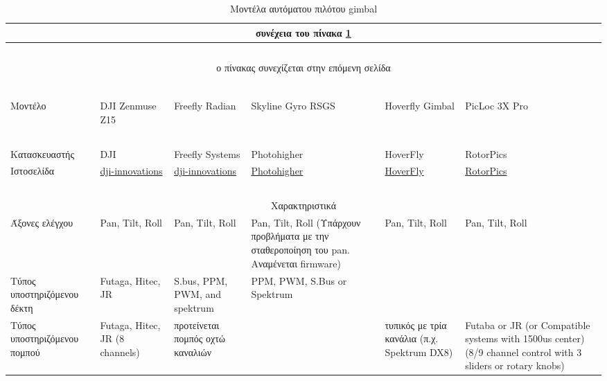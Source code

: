 \documentclass[a4paper, 12pt, twoside]{report}
\begin{document}
{{{{{{			\begin{landscape}	
			\setlength\LTleft{0pt}            %
			\setlength\LTright{0pt}           %
	
			\begin{longtable} { m{3cm} m{3cm} m{3cm} m{3cm} m{3cm} m{3cm} }
					\caption [Μοντέλα αυτόματου πιλότου gimbal]{Μοντέλα αυτόματου πιλότου gimbal}
					\label{πιν.:Μοντέλα αυτόματου πιλότου gimbal}\\
					\hline
					\endfirsthead
					\multicolumn{6}{c}{συνέχεια του πίνακα \ref{πιν.:Μοντέλα αυτόματου πιλότου gimbal}}\\
					\hline
					~\\
					\endhead
					\hline
					\multicolumn{6}{c}{ο πίνακας συνεχίζεται στην επόμενη σελίδα}\\
					\endfoot
					\multicolumn{6}{c}{ολοκληρώθηκε ο πίνακας \ref{πιν.:Μοντέλα αυτόματου πιλότου gimbal}}\\
					\endlastfoot
					~\\
					Μοντέλο & DJI Zenmuse Z15 & Freefly Radian & Skyline Gyro RSGS & Hoverfly Gimbal & PicLoc 3X Pro\\
					\hline
					~\\
					Κατασκευαστής & DJI & Freefly Systems & Photohigher & HoverFly & RotorPics\\
					Ιστοσελίδα & \href{http://www.dji-innovations.com/products/zenmuse-z15/overview/}{dji-innovations} & \href{http://www.freeflysystems.com/products/freefly-radian.php}{dji-innovations} & \href{http://photohigher.co.nz/products/flight-and-gimbal-control-systems/skyline-gyro-rsgs/}{Photohigher} & \href{http://www.hoverflytech.com/gimbal_1WNK.html}{HoverFly} & \href{http://www.rotorpics.com/}{RotorPics}\\
					\hline
					~\\
					\multicolumn{6}{c}{Χαρακτηριστικά}\\
					\hdashline
					Άξονες ελέγχου & Pan, Tilt, Roll & Pan, Tilt, Roll & Pan, Tilt, Roll (Υπάρχουν προβλήματα με την σταθεροποίηση του pan. Αναμένεται firmware) & Pan, Tilt, Roll & Pan, Tilt, Roll\\
					\hdashline
					Τύπος υποστηριζόμενου δέκτη & Futaga, Hitec, JR & S.bus, PPM, PWM, and spektrum & PPM, PWM, S.Bus or Spektrum & & \\
					\hdashline
					Τύπος υποστηριζόμενου πομπού & Futaga, Hitec, JR (8 channels) & προτείνεται πομπός οχτώ καναλιών & & τυπικός με τρία κανάλια (π.χ. Spektrum DX8) & Futaba or JR (or Compatible systems with 1500us center) (8/9 channel control with 3 sliders or rotary knobs)\\

\end{longtable}
\end{landscape}}}}}}}
\end{document}
